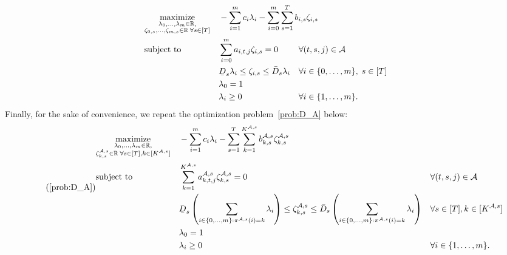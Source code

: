 \documentclass[nonblindrev,mnsc]{informs3} %
\def\Real{\mathbb{R}}
\let\R\Real
\newcommand{\ubar}[1]{\text{\b{$#1$}}}
\begin{document}
\begin{APPENDICES}
\begin{equation}
\begin{aligned}
&\underset{ \substack{
\lambda_0,\ldots,\lambda_m \in \R, \\
\zeta_{0,s},\ldots,\zeta_{m,s} \in \R \; \forall s \in [T]}}{\textnormal{maximize}}&& - \sum_{i=1}^m c_i \lambda_i - \sum_{i=0}^m \sum_{s=1}^T  b_{i,s} \zeta_{i,s}   \\
&\textnormal{subject to}&& \begin{aligned}[t]
&\sum_{i=0}^m   a_{i,t,j}  \zeta_{i,s}= 0 && \forall (t,s,j) \in \mathcal{A} \\
&  \ubar{D}_s \lambda_i  \le \zeta_{i,s} \le \bar{D}_s \lambda_i && \forall i \in \{0,\ldots,m\}, \; s \in [T]\\
& \lambda_0 = 1 \\
&\lambda_i \ge 0 && \forall i \in \{1,\ldots,m\}.  
\end{aligned}
\end{aligned} 
\end{equation} 
Finally, for the sake of convenience, we repeat the optimization problem~\eqref{prob:D_A} below:
\begin{equation} \tag{\ref{prob:D_A}}
\begin{aligned}
&\underset{ \substack{
\lambda_0,\ldots,\lambda_m \in \R, \\
\zeta^{\mathcal{A},s}_{k,s} \in \R \; \forall s \in [T], k \in [K^{\mathcal{A},s}]}}{\textnormal{maximize}}&& - \sum_{i=1}^m c_i \lambda_i -  \sum_{s=1}^T  \sum_{k=1}^{K^{\mathcal{A},s}} b^{\mathcal{A},s}_{k,s} \zeta^{\mathcal{A},s}_{k,s}  \\
&\textnormal{subject to}&& \begin{aligned}[t]
&\sum_{k=1}^{K^{\mathcal{A},s}}  a^{\mathcal{A},s}_{k,t,j}  \zeta^{\mathcal{A},s}_{k,s}   = 0 && \forall (t,s,j) \in \mathcal{A} \\
&  \ubar{D}_s \left( \sum_{i \in \{0,\ldots,m\}: \pi^{\mathcal{A},s}(i) = k} \lambda_{i} \right)   \le \zeta^{\mathcal{A},s}_{k,s}  \le \bar{D}_s \left( \sum_{i \in \{0,\ldots,m\}: \pi^{\mathcal{A},s}(i) = k} \lambda_{i} \right)  && \forall  s \in [T], k \in [ K^{\mathcal{A},s}]\\
& \lambda_0 = 1 \\
&\lambda_i \ge 0 && \forall i \in \{1,\ldots,m\}. 
\end{aligned}
\end{aligned} 
\end{equation}



\end{APPENDICES}
\end{document}

